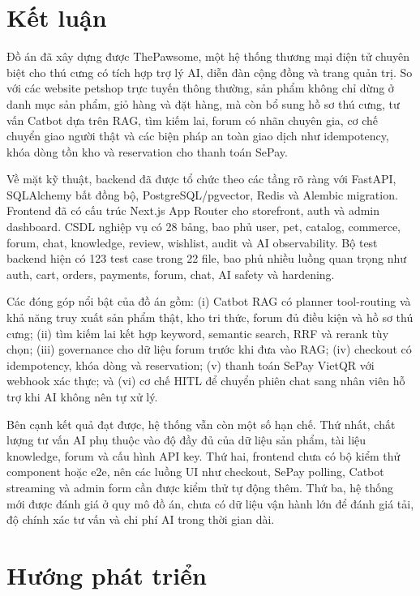 \documentclass[../DoAn.tex]{subfiles}
\begin{document}
\section{Kết luận}
\label{section:6.1}

Đồ án đã xây dựng được ThePawsome, một hệ thống thương mại điện tử chuyên biệt cho thú cưng có tích hợp trợ lý AI, diễn đàn cộng đồng và trang quản trị. So với các website petshop trực tuyến thông thường, sản phẩm không chỉ dừng ở danh mục sản phẩm, giỏ hàng và đặt hàng, mà còn bổ sung hồ sơ thú cưng, tư vấn Catbot dựa trên RAG, tìm kiếm lai, forum có nhãn chuyên gia, cơ chế chuyển giao người thật và các biện pháp an toàn giao dịch như idempotency, khóa dòng tồn kho và reservation cho thanh toán SePay.

Về mặt kỹ thuật, backend đã được tổ chức theo các tầng rõ ràng với FastAPI, SQLAlchemy bất đồng bộ, PostgreSQL/pgvector, Redis và Alembic migration. Frontend đã có cấu trúc Next.js App Router cho storefront, auth và admin dashboard. CSDL nghiệp vụ có 28 bảng, bao phủ user, pet, catalog, commerce, forum, chat, knowledge, review, wishlist, audit và AI observability. Bộ test backend hiện có 123 test case trong 22 file, bao phủ nhiều luồng quan trọng như auth, cart, orders, payments, forum, chat, AI safety và hardening.

Các đóng góp nổi bật của đồ án gồm: (i) Catbot RAG có planner tool-routing và khả năng truy xuất sản phẩm thật, kho tri thức, forum đủ điều kiện và hồ sơ thú cưng; (ii) tìm kiếm lai kết hợp keyword, semantic search, RRF và rerank tùy chọn; (iii) governance cho dữ liệu forum trước khi đưa vào RAG; (iv) checkout có idempotency, khóa dòng và reservation; (v) thanh toán SePay VietQR với webhook xác thực; và (vi) cơ chế HITL để chuyển phiên chat sang nhân viên hỗ trợ khi AI không nên tự xử lý.

Bên cạnh kết quả đạt được, hệ thống vẫn còn một số hạn chế. Thứ nhất, chất lượng tư vấn AI phụ thuộc vào độ đầy đủ của dữ liệu sản phẩm, tài liệu knowledge, forum và cấu hình API key. Thứ hai, frontend chưa có bộ kiểm thử component hoặc e2e, nên các luồng UI như checkout, SePay polling, Catbot streaming và admin form cần được kiểm thử tự động thêm. Thứ ba, hệ thống mới được đánh giá ở quy mô đồ án, chưa có dữ liệu vận hành lớn để đánh giá tải, độ chính xác tư vấn và chi phí AI trong thời gian dài.

\section{Hướng phát triển}
\label{section:6.2}
\end{document}
